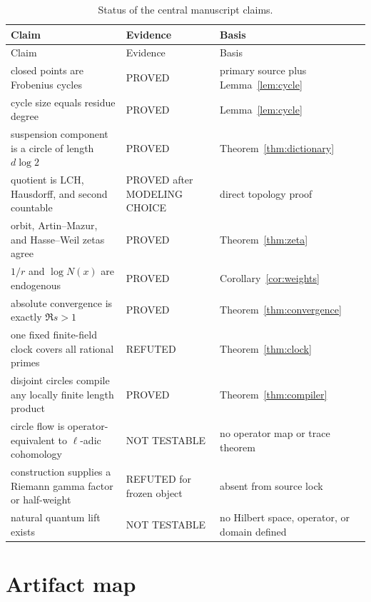 \documentclass[11pt]{article}
\theoremstyle{definition}
\theoremstyle{remark}
\newcommand{\proved}{\textsf{PROVED}}
\newcommand{\modelchoice}{\textsf{MODELING CHOICE}}
\newcommand{\nottest}{\textsf{NOT TESTABLE}}
\newcommand{\refuted}{\textsf{REFUTED}}
\begin{document}
\begin{longtable}{@{}L{0.38\textwidth}L{0.18\textwidth}L{0.36\textwidth}@{}}
\caption{Status of the central manuscript claims.}\label{tab:claims}\\
\toprule
Claim & Evidence & Basis\\
\midrule
\endfirsthead
\toprule
Claim & Evidence & Basis\\
\midrule
\endhead
closed points are Frobenius cycles & \proved & primary source plus Lemma~\ref{lem:cycle}\\
cycle size equals residue degree & \proved & Lemma~\ref{lem:cycle}\\
suspension component is a circle of length \(d\log2\) & \proved & Theorem~\ref{thm:dictionary}\\
quotient is LCH, Hausdorff, and second countable & \proved{} after \modelchoice & direct topology proof\\
orbit, Artin--Mazur, and Hasse--Weil zetas agree & \proved & Theorem~\ref{thm:zeta}\\
\(1/r\) and \(\log N(x)\) are endogenous & \proved & Corollary~\ref{cor:weights}\\
absolute convergence is exactly \(\Re s>1\) & \proved & Theorem~\ref{thm:convergence}\\
one fixed finite-field clock covers all rational primes & \refuted & Theorem~\ref{thm:clock}\\
disjoint circles compile any locally finite length product & \proved & Theorem~\ref{thm:compiler}\\
circle flow is operator-equivalent to \(\ell\)-adic cohomology & \nottest & no operator map or trace theorem\\
construction supplies a Riemann gamma factor or half-weight & \refuted{} for frozen object & absent from source lock\\
natural quantum lift exists & \nottest & no Hilbert space, operator, or domain defined\\
\bottomrule
\end{longtable}

\section{Artifact map}
\end{document}
